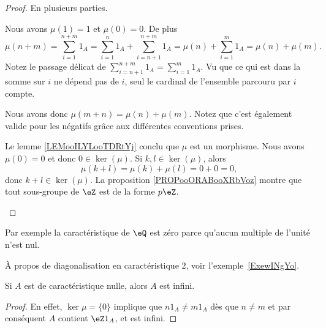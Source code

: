 \begin{proof}
	En plusieurs parties.
	\begin{subproof}
		Nous avons \( \mu(1)=1\) et \( \mu(0)=0\). De plus
		\begin{equation}
			\mu(n+m)=\sum_{i=1}^{n+m}1_A=\sum_{i=1}^n1_A+\sum_{i=n+1}^{n+m}1_A=\mu(n)+\sum_{i=1}^m1_A=\mu(n)+\mu(m).
		\end{equation}
		Notez le passage délicat de \( \sum_{i=n+1}^{n+m}1_A=\sum_{i=1}^m1_A\). Vu que ce qui est dans la somme sur \( i\) ne dépend pas de \( i\), seul le cardinal de l'ensemble parcouru par \( i\) compte.

		Nous avons donc \( \mu(m+n)=\mu(n)+\mu(m)\). Notez que c'est également valide pour les négatifs grâce aux différentes conventions prises.

		Le lemme \ref{LEMooILYLooTDRtYj} conclu que \( \mu\) est un morphisme.
		Nous avons \( \mu(0)=0\) et donc \( 0\in \ker(\mu)\). Si \( k,l\in \ker(\mu)\), alors
		\begin{equation}
			\mu(k+l)=\mu(k)+\mu(l)=0+0=0,
		\end{equation}
		donc \( k+l\in \ker(\mu)\).
		La proposition \ref{PROPooORABooXRbVoz} montre que tout sous-groupe de \( \eZ\) est de la forme \( p\eZ\).
	\end{subproof}
\end{proof}

Par exemple la caractéristique de \( \eQ\) est zéro parce qu'aucun multiple de l'unité n'est nul.

À propos de diagonalisation en caractéristique \( 2\), voir l'exemple~\ref{ExewINgYo}.

\begin{lemma}
	Si \( A\) est de caractéristique nulle, alors \( A\) est infini.
\end{lemma}

\begin{proof}
	En effet, \( \ker\mu=\{0\} \) implique que \( n1_A \neq  m1_A\) dès que \(n \neq m \) et par conséquent \( A\) contient \(\eZ 1_A \), et  est infini.
\end{proof}


